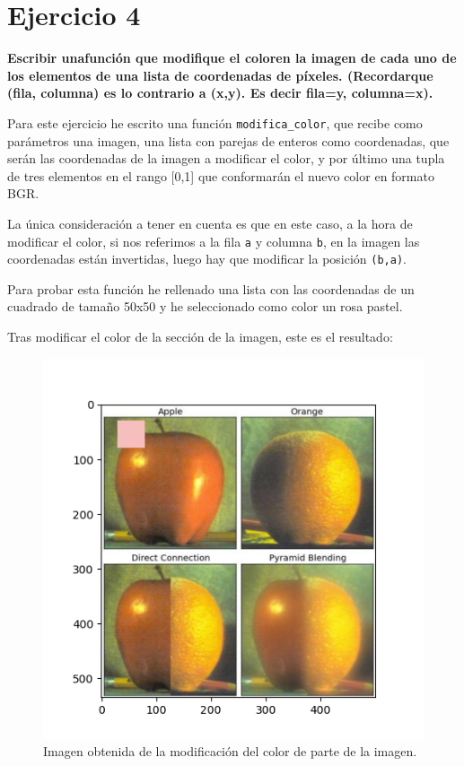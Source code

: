 \documentclass[12pt, spanish]{article}
\begin{document}
\newpage

\section{Ejercicio 4}

\textbf{\large Escribir unafunción que modifique el coloren la imagen de cada uno de los elementos de una lista de coordenadas de píxeles. (Recordarque (fila, columna) es lo contrario a (x,y). Es decir fila=y, columna=x).}

Para este ejercicio he escrito una función \texttt{modifica\_color}, que recibe como parámetros una imagen, una lista con parejas de enteros como coordenadas, que serán las coordenadas de la imagen a modificar el color, y por último una tupla de tres elementos en el rango [0,1] que conformarán el nuevo color en formato BGR.

La única consideración a tener en cuenta es que en este caso, a la hora de modificar el color, si nos referimos a la fila \texttt{a} y columna \texttt{b}, en la imagen las coordenadas están invertidas, luego hay que modificar la posición \texttt{(b,a)}.

Para probar esta función he rellenado una lista con las coordenadas de un cuadrado de tamaño 50x50 y he seleccionado como color un rosa pastel.

Tras modificar el color de la sección de la imagen, este es el resultado:

\begin{figure}[H]
	\centering
	\includegraphics[scale = 1]{color.png}
	\caption{Imagen obtenida de la modificación del color de parte de la imagen.}
	\label{fig:ej4}
	
\end{figure}
\end{document}
